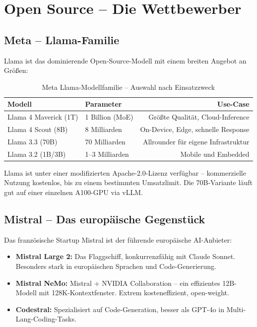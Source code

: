 \section{Open Source -- Die Wettbewerber}

\subsection{Meta -- Llama-Familie}

Llama ist das dominierende Open-Source-Modell mit einem breiten Angebot an Größen:

\begin{table}[H]
\centering
\begin{tabularx}{\linewidth}{lXr}
\toprule
\textbf{Modell} & \textbf{Parameter} & \textbf{Use-Case} \\
\midrule
Llama 4 Maverick (1T) & 1 Billion (MoE) & Größte Qualität, Cloud-Inference \\
Llama 4 Scout (8B) & 8 Milliarden & On-Device, Edge, schnelle Response \\
Llama 3.3 (70B) & 70 Milliarden & Allrounder für eigene Infrastruktur \\
Llama 3.2 (1B/3B) & 1--3 Milliarden & Mobile und Embedded \\
\bottomrule
\end{tabularx}
\caption{Meta Llama-Modellfamilie -- Auswahl nach Einsatzzweck}
\label{tab:llama}
\end{table}

Llama ist unter einer modifizierten Apache-2.0-Lizenz verfügbar -- kommerzielle Nutzung kostenlos, bis zu einem bestimmten Umsatzlimit. Die 70B-Variante läuft gut auf einer einzelnen A100-GPU via vLLM.

\subsection{Mistral -- Das europäische Gegenstück}

Das französische Startup Mistral ist der führende europäische AI-Anbieter:

\begin{itemize}[leftmargin=*]
    \item \textbf{Mistral Large 2:} Das Flaggschiff, konkurrenzfähig mit Claude Sonnet. Besonders stark in europäischen Sprachen und Code-Generierung.
    \item \textbf{Mistral NeMo:} Mistral + NVIDIA Collaboration -- ein effizientes 12B-Modell mit 128K-Kontextfenster. Extrem kosteneffizient, open-weight.
    \item \textbf{Codestral:} Spezialisiert auf Code-Generation, besser als GPT-4o in Multi-Lang-Coding-Tasks.
\end{itemize}

